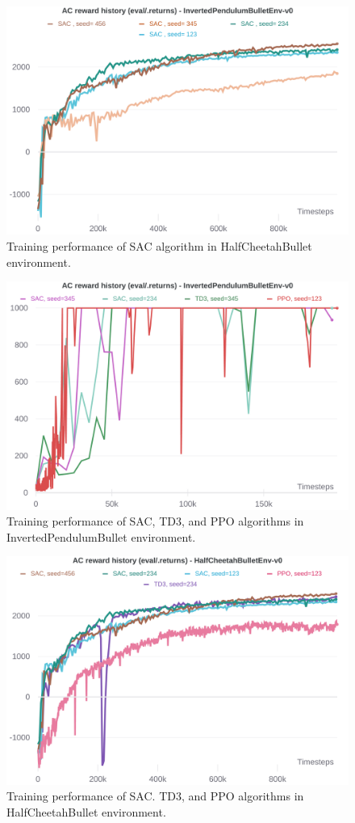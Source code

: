 \documentclass[12pt]{article}
\begin{document}
\begin{figure}[phb] 
	\centering  %
    \includegraphics[width=0.65\columnwidth]{img/Figure_8_WB_HalfCheetahBullet_SAC.png}
	\caption{Training performance of SAC algorithm in HalfCheetahBullet environment.}
	\label{fig:fig8}
\end{figure}

\pagebreak

\begin{figure}[pht] 
	\centering  %
    \includegraphics[width=0.65\columnwidth]{img/Figure_9_WB_InvertedPendulumBullet.png}
	\caption{Training performance of SAC, TD3, and PPO algorithms in InvertedPendulumBullet environment.}
	\label{fig:fig9}
\end{figure}

\begin{figure}[phb] 
	\centering  %
    \includegraphics[width=0.65\columnwidth]{img/Figure_10_WB_HalfCheetahBullet.png}
	\caption{Training performance of SAC. TD3, and PPO algorithms in HalfCheetahBullet environment.}
	\label{fig:fig10}
\end{figure}
\end{document}
